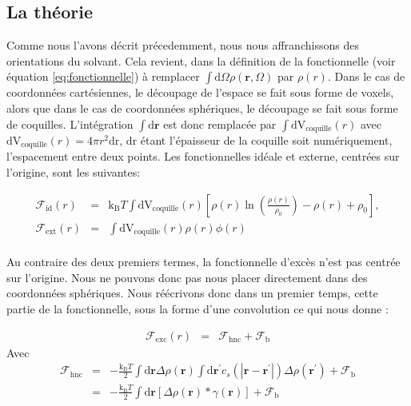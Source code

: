 \subsection{La théorie}
Comme nous l'avons décrit précedemment, nous nous affranchissons des orientations du solvant. Cela revient, dans la définition de la fonctionnelle (voir équation \ref{eq:fonctionnelle}) à remplacer $\int\mathrm{d}\Omega\rho(\boldsymbol{r}, \Omega)$ par $\rho(r)$. Dans le cas de coordonnées cartésiennes, le découpage de l'espace se fait sous forme de voxels, alors que dans le cas de coordonnées sphériques, le découpage se fait sous forme de coquilles. L'intégration $\int\mathrm{d}\boldsymbol{r}$ est donc remplacée par $\int\mathrm{dV}_{\mathrm{coquille}}(r)$ avec $\mathrm{dV}_{\mathrm{coquille}}(r)=4 \pi r^2 \mathrm{dr}$, $\mathrm{dr}$ étant l'épaisseur de la coquille soit numériquement, l'espacement entre deux points. Les fonctionnelles idéale et externe, centrées sur l'origine, sont les suivantes:

\begin{eqnarray}
\mathcal{F}_\mathrm{id}(r)&=&\mathrm{k_B}T\int\mathrm{dV}_{\mathrm{coquille}}(r) [ \rho\left(r \right)\ln\left(\frac{\rho\left(r \right)}{\rho_0}\right)-\rho\left(r \right)+\rho_0 ],\\
\mathcal{F}_\mathrm{ext}(r)&=&\int\mathrm{ dV}_{\mathrm{coquille}}(r)\rho\left(r \right)\phi\left(r \right)\\
\end{eqnarray}

Au contraire des deux premiers termes, la fonctionnelle d'excès n'est pas centrée sur l'origine. Nous ne pouvons donc pas nous placer directement dans des coordonnées sphériques. Nous réécrivons donc dans un premier temps, cette partie de la fonctionnelle, sous la forme d'une convolution ce qui nous donne :

\begin{eqnarray}
\mathcal{F}_\mathrm{exc}(r) &=& \mathcal{F}_\mathrm{hnc} + \mathcal{F}_\mathrm{b}
\end{eqnarray}
Avec
\begin{eqnarray}
\mathcal{F}_\mathrm{hnc}&=& -\frac{\mathrm{k_B}T}{2}\int\mathrm{d}\boldsymbol{r} \Delta\rho\left( \boldsymbol{r} \right)  \int\mathrm{d}\boldsymbol{r}^\prime c_s\left( \left|\boldsymbol{r}-\boldsymbol{r}^\prime\right| \right) \Delta\rho\left( \boldsymbol{r}^\prime \right) + \mathcal{F}_\mathrm{b}\\
						 &=& -\frac{\mathrm{k_B}T}{2}\int\mathrm{d}\boldsymbol{r} [ \Delta\rho\left( \boldsymbol{r} \right)  *\gamma( \boldsymbol{r} ) ] + \mathcal{F}_\mathrm{b}
\end{eqnarray}


